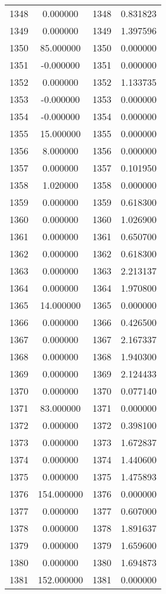 \documentclass[12pt]{article}
\begin{document}
\begin{longtable}{@{}cccc@{}}
1348 & 0.000000 & 1348 & 0.831823 \\
1349 & 0.000000 & 1349 & 1.397596 \\
1350 & 85.000000 & 1350 & 0.000000 \\
1351 & -0.000000 & 1351 & 0.000000 \\
1352 & 0.000000 & 1352 & 1.133735 \\
1353 & -0.000000 & 1353 & 0.000000 \\
1354 & -0.000000 & 1354 & 0.000000 \\
1355 & 15.000000 & 1355 & 0.000000 \\
1356 & 8.000000 & 1356 & 0.000000 \\
1357 & 0.000000 & 1357 & 0.101950 \\
1358 & 1.020000 & 1358 & 0.000000 \\
1359 & 0.000000 & 1359 & 0.618300 \\
1360 & 0.000000 & 1360 & 1.026900 \\
1361 & 0.000000 & 1361 & 0.650700 \\
1362 & 0.000000 & 1362 & 0.618300 \\
1363 & 0.000000 & 1363 & 2.213137 \\
1364 & 0.000000 & 1364 & 1.970800 \\
1365 & 14.000000 & 1365 & 0.000000 \\
1366 & 0.000000 & 1366 & 0.426500 \\
1367 & 0.000000 & 1367 & 2.167337 \\
1368 & 0.000000 & 1368 & 1.940300 \\
1369 & 0.000000 & 1369 & 2.124433 \\
1370 & 0.000000 & 1370 & 0.077140 \\
1371 & 83.000000 & 1371 & 0.000000 \\
1372 & 0.000000 & 1372 & 0.398100 \\
1373 & 0.000000 & 1373 & 1.672837 \\
1374 & 0.000000 & 1374 & 1.440600 \\
1375 & 0.000000 & 1375 & 1.475893 \\
1376 & 154.000000 & 1376 & 0.000000 \\
1377 & 0.000000 & 1377 & 0.607000 \\
1378 & 0.000000 & 1378 & 1.891637 \\
1379 & 0.000000 & 1379 & 1.659600 \\
1380 & 0.000000 & 1380 & 1.694873 \\
1381 & 152.000000 & 1381 & 0.000000 \\

\end{longtable}
\end{document}
